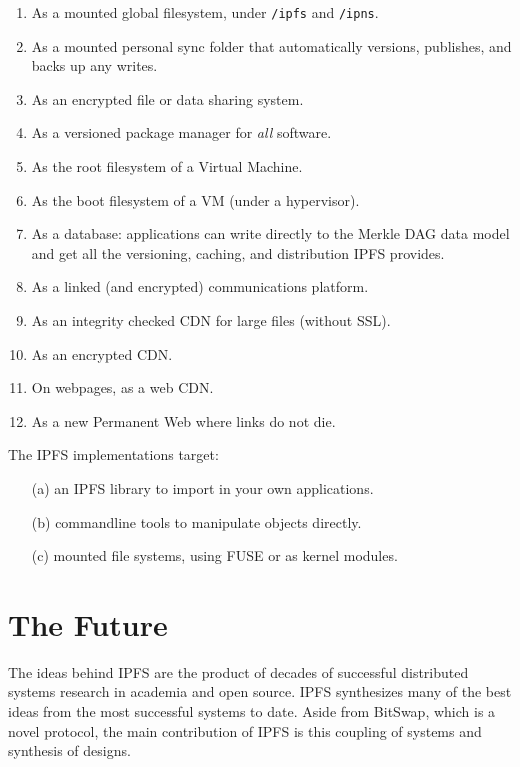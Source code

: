\documentclass{sig-alternate}
\begin{document}
\begin{enumerate}
  \item As a mounted global filesystem, under \texttt{/ipfs} and \texttt{/ipns}.
  \item As a mounted personal sync folder that automatically versions, publishes, and backs up any writes.
  \item As an encrypted file or data sharing system.
  \item As a versioned package manager for \textit{all} software.
  \item As the root filesystem of a Virtual Machine.
  \item As the boot filesystem of a VM (under a hypervisor).
  \item As a database: applications can write directly to the Merkle DAG data model and get all the versioning, caching, and distribution IPFS provides.
  \item As a linked (and encrypted) communications platform.
  \item As an integrity checked CDN for large files (without SSL).
  \item As an encrypted CDN.
  \item On webpages, as a web CDN.
  \item As a new Permanent Web where links do not die.
\end{enumerate}

The IPFS implementations target:

\begin{enumerate}
  \item[(a)] an IPFS library to import in your own applications.
  \item[(b)] commandline tools to manipulate objects directly.
  \item[(c)] mounted file systems, using FUSE \cite{FUSE} or as kernel modules.
\end{enumerate}


\section{The Future}

The ideas behind IPFS are the product of decades of successful distributed systems research in academia and open source. IPFS synthesizes many of the best ideas from the most successful systems to date. Aside from BitSwap, which is a novel protocol, the main contribution of IPFS is this coupling of systems and synthesis of designs.
\end{document}

